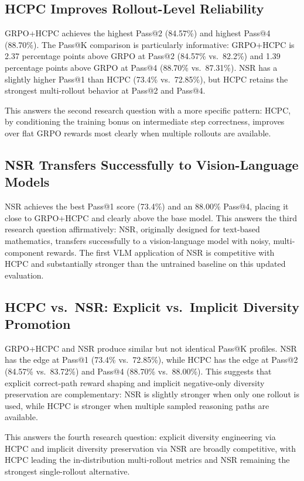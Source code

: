 \documentclass{iutbscthesis}
\begin{document}
\subsection{HCPC Improves Rollout-Level Reliability}

GRPO+HCPC achieves the highest Pass@2 (84.57\%) and highest Pass@4 (88.70\%). The Pass@K comparison is particularly informative: GRPO+HCPC is 2.37 percentage points above GRPO at Pass@2 (84.57\% vs.\ 82.2\%) and 1.39 percentage points above GRPO at Pass@4 (88.70\% vs.\ 87.31\%). NSR has a slightly higher Pass@1 than HCPC (73.4\% vs.\ 72.85\%), but HCPC retains the strongest multi-rollout behavior at Pass@2 and Pass@4.

This answers the second research question with a more specific pattern: HCPC, by conditioning the training bonus on intermediate step correctness, improves over flat GRPO rewards most clearly when multiple rollouts are available.

\subsection{NSR Transfers Successfully to Vision-Language Models}

NSR achieves the best Pass@1 score (73.4\%) and an 88.00\% Pass@4, placing it close to GRPO+HCPC and clearly above the base model. This answers the third research question affirmatively: NSR, originally designed for text-based mathematics, transfers successfully to a vision-language model with noisy, multi-component rewards. The first VLM application of NSR is competitive with HCPC and substantially stronger than the untrained baseline on this updated evaluation.

\subsection{HCPC vs.\ NSR: Explicit vs.\ Implicit Diversity Promotion}

GRPO+HCPC and NSR produce similar but not identical Pass@K profiles. NSR has the edge at Pass@1 (73.4\% vs.\ 72.85\%), while HCPC has the edge at Pass@2 (84.57\% vs.\ 83.72\%) and Pass@4 (88.70\% vs.\ 88.00\%). This suggests that explicit correct-path reward shaping and implicit negative-only diversity preservation are complementary: NSR is slightly stronger when only one rollout is used, while HCPC is stronger when multiple sampled reasoning paths are available.

This answers the fourth research question: explicit diversity engineering via HCPC and implicit diversity preservation via NSR are broadly competitive, with HCPC leading the in-distribution multi-rollout metrics and NSR remaining the strongest single-rollout alternative.
\end{document}
